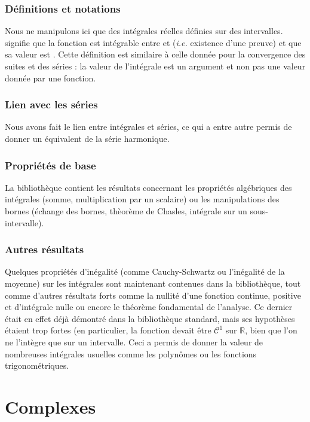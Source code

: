 \subsubsection{Définitions et notations}
	Nous ne manipulons ici que des intégrales réelles définies sur des intervalles.  signifie que la fonction  est intégrable entre  et  (\emph{i.e.} existence d'une preuve) et que sa valeur est . Cette définition est similaire à celle donnée pour la convergence des suites et des séries : la valeur de l'intégrale est un argument et non pas une valeur donnée par une fonction.
	
	\subsubsection{Lien avec les séries}
		Nous avons fait le lien entre intégrales et séries, ce qui a entre autre permis de donner un équivalent de la série harmonique.
	
\subsubsection{Propriétés de base}
	La bibliothèque contient les résultats concernant les propriétés algébriques des intégrales (somme, multiplication par un scalaire) ou les manipulations des bornes (échange des bornes, thèorème de Chasles, intégrale sur un sous-intervalle).
	
	\subsubsection{Autres résultats}
	Quelques propriétés d'inégalité (comme Cauchy-Schwartz ou l'inégalité de la moyenne) sur les intégrales sont maintenant contenues dans la bibliothèque, tout comme d'autres résultats forts comme la nullité d'une fonction continue, positive et d'intégrale nulle ou encore le théorème fondamental de l'analyse. 
	Ce dernier était en effet déjà démontré dans la bibliothèque standard, mais ses hypothèses étaient trop fortes (en particulier, la fonction devait être $\mathcal{C}^1$ sur $\mathbb{R}$, bien que l'on ne l'intègre que sur un intervalle. Ceci a permis de donner la valeur de nombreuses intégrales usuelles comme les polynômes ou les fonctions trigonométriques.
	
\section{Complexes}

